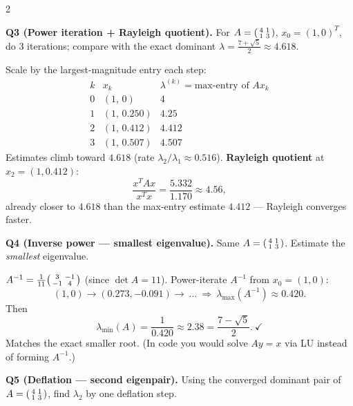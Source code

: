 \documentclass[10pt,a4paper]{article}
\newenvironment{sol}%
  {\par\vspace{2pt}\begingroup\setlength{\fboxsep}{5pt}%
   \begin{lrbox}{\sbx}\begin{minipage}{\dimexpr\linewidth-2\fboxsep\relax}}%
  {\end{minipage}\end{lrbox}\colorbox{solbg}{\usebox{\sbx}}\endgroup\par\vspace{4pt}}
\begin{document}
\begin{multicols}{2}

\textbf{Q3 (Power iteration + Rayleigh quotient).} For $A=\begin{psmallmatrix}4&1\\1&3\end{psmallmatrix}$, $x_0=(1,0)^T$, do 3 iterations; compare with the exact dominant $\lambda=\tfrac{7+\sqrt5}{2}\approx4.618$.

\begin{sol}
Scale by the largest-magnitude entry each step:
\[ \begin{array}{c|c|c}
k & x_k & \lambda^{(k)}=\text{max-entry of }Ax_k\\\hline
0 & (1,\,0) & 4\\
1 & (1,\,0.250) & 4.25\\
2 & (1,\,0.412) & 4.412\\
3 & (1,\,0.507) & 4.507
\end{array} \]
Estimates climb toward $4.618$ (rate $\lambda_2/\lambda_1\approx0.516$).
\textbf{Rayleigh quotient} at $x_2=(1,0.412)$:
\[ \frac{x^TAx}{x^Tx}=\frac{5.332}{1.170}\approx 4.56, \]
already closer to $4.618$ than the max-entry estimate $4.412$ — Rayleigh converges faster.
\end{sol}

\textbf{Q4 (Inverse power — smallest eigenvalue).} Same $A=\begin{psmallmatrix}4&1\\1&3\end{psmallmatrix}$. Estimate the \emph{smallest} eigenvalue.

\begin{sol}
$A^{-1}=\tfrac{1}{11}\begin{psmallmatrix}3&-1\\-1&4\end{psmallmatrix}$ (since $\det A=11$). Power-iterate $A^{-1}$ from $x_0=(1,0)$:
\[ (1,0)\to(0.273,-0.091)\to\ \dots\ \Rightarrow\ \lambda_{\max}(A^{-1})\approx0.420. \]
Then
\[ \lambda_{\min}(A)=\frac{1}{0.420}\approx 2.38=\frac{7-\sqrt5}{2}.\ \checkmark \]
Matches the exact smaller root. (In code you would solve $Ay=x$ via LU instead of forming $A^{-1}$.)
\end{sol}

\textbf{Q5 (Deflation — second eigenpair).} Using the converged dominant pair of $A=\begin{psmallmatrix}4&1\\1&3\end{psmallmatrix}$, find $\lambda_2$ by one deflation step.


\end{multicols}
\end{document}
